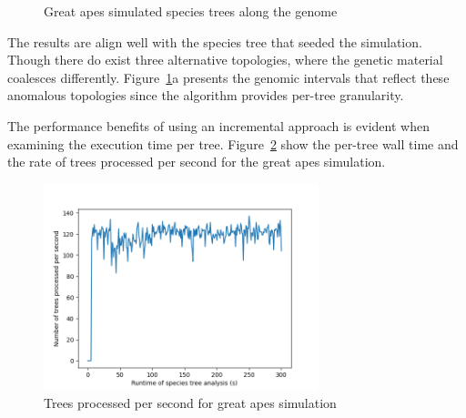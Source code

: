 \documentclass{article}
\begin{document}
\begin{figure}[H]
\begin{minipage}{.48\textwidth}
\begin{minipage}{.4\textwidth}
            \begin{subfigure}[b]{\linewidth}
                
            \end{subfigure}
        \end{minipage}
        \begin{minipage}{.4\textwidth}
            \begin{subfigure}[b]{\linewidth}
                
            \end{subfigure}
            \begin{subfigure}[b]{\linewidth}
                
            \end{subfigure}
        \end{minipage}
        \centering
    \end{minipage}
    \centering
    \caption{Great apes simulated species trees along the genome}
    \label{fig:great_apes}
\end{figure}

The results are align well with the species tree that seeded the
simulation. Though there do exist three alternative topologies, where the
genetic material coalesces differently. Figure~\ref{fig:great_apes}a presents
the genomic intervals that reflect these anomalous topologies since the algorithm
provides per-tree granularity.

The performance benefits of using an incremental approach is evident when
examining the execution time per tree. Figure~\ref{fig:incremental_times}
show the per-tree wall time and the rate of trees processed per second
for the great apes simulation.
\begin{figure}[H]
    \includegraphics[height=6cm]{trees_per_sec.png}
    \centering
    \caption{Trees processed per second for great apes simulation}
    \label{fig:incremental_times}
\end{figure}
\end{document}
